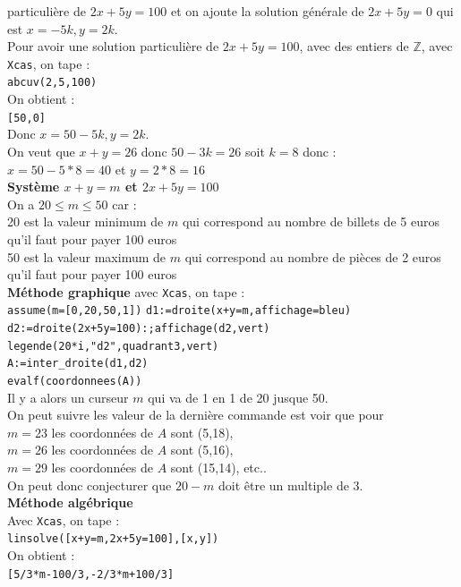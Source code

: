 \documentclass[a4paper,11pt]{book}
\newcommand{\Z}{{\mathbb{Z}}}
\begin{document}
\begin{enumerate}
particuli\`ere de $2x+5y=100$ et on ajoute la solution g\'en\'erale de 
$2x+5y=0$ qui est $x=-5k,y=2k$.\\
Pour avoir une  solution particuli\`ere de $2x+5y=100$, avec des entiers de 
$\Z$, avec {\tt Xcas}, on tape :\\
{\tt abcuv(2,5,100)}\\
On obtient :\\
{\tt [50,0]}\\
Donc $x=50-5k,y=2k$.\\
On veut que $x+y=26$ donc $50-3k=26$ soit $k=8$ donc :\\
$x=50-5*8=40$ et $y=2*8=16$\\ 
{\bf Syst\`eme  $x+y=m$ et $2x+5y=100$}\\
On a $20\leq m\leq 50$ car :\\
20 est la valeur minimum de $m$ qui correspond au nombre de billets de 5 euros 
 qu'il faut pour  payer 100 euros \\
50 est la valeur maximum de $m$ qui correspond au nombre de pi\`eces de 2 euros 
qu'il faut  pour  payer 100 euros\\
{\bf M\'ethode graphique} avec {\tt Xcas}, on tape :\\
{\tt assume(m=[0,20,50,1])}
{\tt d1:=droite(x+y=m,affichage=bleu)}\\
{\tt d2:=droite(2x+5y=100):;affichage(d2,vert)}\\
{\tt legende(20*i,"d2",quadrant3,vert)}\\
{\tt A:=inter\_droite(d1,d2)}\\
{\tt evalf(coordonnees(A))}\\
Il y a alors un curseur $m$ qui va de 1 en 1 de 20 jusque 50.\\
On peut suivre les valeur de la derni\`ere commande est voir que pour \\
$m=23$ les coordonn\'ees de $A$ sont (5,18),\\
$m=26$ les coordonn\'ees de $A$ sont (5,16),\\
$m=29$ les coordonn\'ees de $A$ sont (15,14), etc..\\
On peut donc conjecturer que $20-m$ doit \^etre un multiple de 3.\\
{\bf M\'ethode alg\'ebrique}\\
Avec {\tt Xcas}, on tape :\\
{\tt linsolve([x+y=m,2x+5y=100],[x,y])}\\
On obtient :\\
{\tt [5/3*m-100/3,-2/3*m+100/3]}\\

\end{enumerate}
\end{document}
